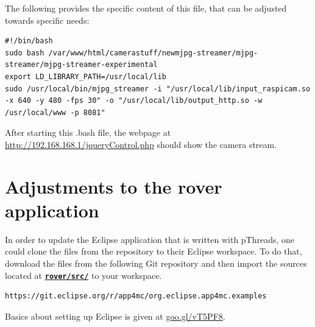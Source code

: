 The following provides the specific content of this file, that can be adjusted towards specific needs:
\begin{lstlisting}
#!/bin/bash
sudo bash /var/www/html/camerastuff/newmjpg-streamer/mjpg-streamer/mjpg-streamer-experimental 
export LD_LIBRARY_PATH=/usr/local/lib
sudo /usr/local/bin/mjpg_streamer -i "/usr/local/lib/input_raspicam.so -x 640 -y 480 -fps 30" -o "/usr/local/lib/output_http.so -w /usr/local/www -p 8081"
\end{lstlisting}
After starting this .bash file, the webpage at \url{http://192.168.168.1/jqueryControl.php} should show the camera stream.
\section{Adjustments to the rover application}
In order to update the Eclipse application that is written with pThreads, one could clone the files from the repository to their Eclipse workspace. To do that, download the files from the following Git repository and then import the sources located at \textbf{\underline{\texttt{rover/src/}}}  to your workspace.
\begin{lstlisting}
https://git.eclipse.org/r/app4mc/org.eclipse.app4mc.examples
\end{lstlisting}
Basics about setting up Eclipse is given at \url{goo.gl/vT5PF8}.
%
